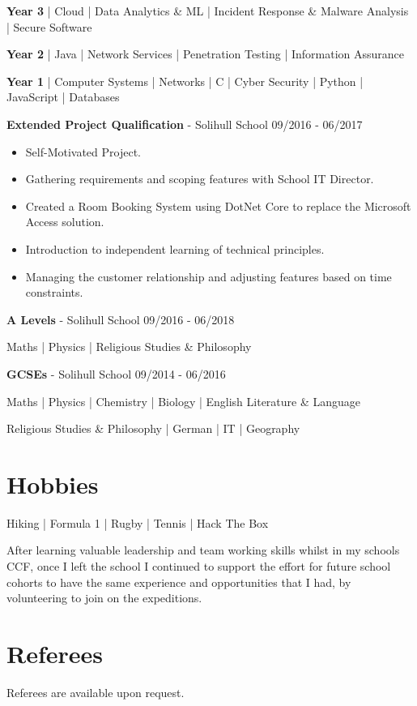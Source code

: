 \documentclass{article}
\begin{document}
\begin{center}
	\textbf{Year 3} | Cloud | Data Analytics \& ML | Incident Response \& Malware Analysis | Secure Software

	\textbf{Year 2} | Java | Network Services | Penetration Testing | Information Assurance

	\textbf{Year 1} | Computer Systems | Networks | C | Cyber Security | Python | JavaScript | Databases
\end{center}

\textbf{Extended Project Qualification} - Solihull School \hfill 09/2016 - 06/2017

\begin{multicols}{2}
\begin{itemize}
\itemsep0em
	\item Self-Motivated Project.
	\item Gathering requirements and scoping features with School IT Director.
	\item Created a Room Booking System using DotNet Core to replace the Microsoft Access solution.
	\item Introduction to independent learning of technical principles.
	\item Managing the customer relationship and adjusting features based on time constraints.
\end{itemize}
\end{multicols}

\textbf{A Levels} - Solihull School \hfill 09/2016 - 06/2018

\begin{center}
Maths | Physics | Religious Studies \& Philosophy
\end{center}

\textbf{GCSEs} - Solihull School \hfill 09/2014 - 06/2016

\begin{center}
Maths | Physics | Chemistry | Biology | English Literature \& Language

Religious Studies \& Philosophy | German | IT | Geography
\end{center}

\section*{Hobbies}

\begin{center}
Hiking | Formula 1 | Rugby | Tennis | Hack The Box
\end{center}

After learning valuable leadership and team working skills whilst in my schools CCF, once I left the school I continued to support the effort for future school cohorts to have the same experience and opportunities that I had, by volunteering to join on the expeditions.

\section*{Referees}

Referees are available upon request.
\end{document}
